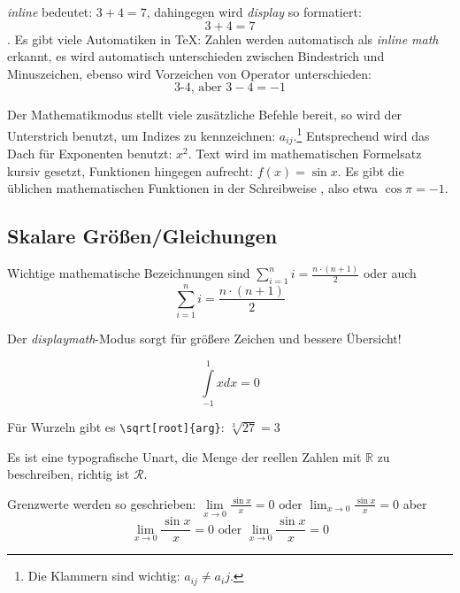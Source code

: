 \textit{inline} bedeutet: \(3+4=7\), dahingegen wird \textit{display} so
formatiert: \[3+4=7\]. Es gibt viele Automatiken in \TeX: Zahlen werden
automatisch als \textit{inline math} erkannt, es wird automatisch
unterschieden zwischen Bindestrich und Minuszeichen, ebenso wird Vorzeichen
von Operator unterschieden:
\[\mbox{3-4, aber } 3-4=-1\]

Der Mathematikmodus stellt viele zusätzliche Befehle bereit, so wird der
Unterstrich benutzt, um Indizes zu kennzeichnen: \(a_{ij}\).\footnote{Die
  Klammern sind wichtig: \(a_{ij} \ne a_ij\).} Entsprechend wird das Dach
für Exponenten benutzt: \(x^{2}\). Text wird im mathematischen Formelsatz
kursiv gesetzt, Funktionen hingegen aufrecht: \(f(x) = \sin x\). Es gibt
die üblichen mathematischen Funktionen in der Schreibweise
\cs{}, also etwa \(\cos \pi = -1\).


\subsection{Skalare Größen/Gleichungen}

Wichtige mathematische Bezeichnungen sind
\(\sum_{i=1}^{n}i=\frac{n\cdot(n+1)}{2}\) oder auch
\[\sum_{i=1}^{n}i=\frac{n\cdot(n+1)}{2}\]

Der \textit{displaymath}-Modus sorgt für größere Zeichen und bessere
Übersicht!

\[\int\limits_{-1}^{1} x dx = 0\]

Für Wurzeln gibt es \lstinline|\sqrt[root]{arg}|: \(\sqrt[3]{27}=3\)

Es ist eine typografische Unart, die Menge der reellen Zahlen mit
\(\mathbb{R}\) zu beschreiben, richtig ist \(\mathcal{R}\).

Grenzwerte werden so geschrieben:
\( \lim\limits_{x\rightarrow0}\frac{\sin x}{x}=0 \mbox{ oder }
\lim_{x\rightarrow0}\frac{\sin x}{x}=0 \) aber
\[
    \lim\limits_{x\rightarrow0}\frac{\sin x}{x}=0 \mbox{ oder }
    \lim_{x\rightarrow0}\frac{\sin x}{x}=0
\]

